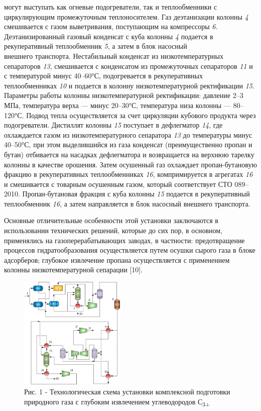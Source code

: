 \begin{multicols}{2}
могут выступать как огневые подогреватели, так и теплообменники с
циркулирующим промежуточным теплоносителем. Газ деэтанизации колонны
\emph{4} смешивается с газом выветривания, поступающим на компрессоры
\emph{6}. Деэтанизированный газовый конденсат с куба колонны \emph{4}
подается в рекуперативный теплообменник \emph{5}, а затем в блок
насосный\\
внешнего транспорта. Нестабильный конденсат из низкотемпературных
сепараторов \emph{13}, смешивается с конденсатом из промежуточных
сепараторов \emph{11} и с температурой минус 40--60°С, подогревается в
рекуперативных теплообменниках \emph{10} и подается в колонну
низкотемпературной ректификации \emph{15}. Параметры работы колонны
низкотемпературной ректификации: давление 2--3 МПа, температура верха
--- минус 20--30°С, температура низа колонны --- 80--120°С. Подвод тепла
осуществляется за счет циркуляции кубового продукта через подогреватели.
Дистиллят колонны \emph{15} поступает в дефлегматор \emph{14}, где
охлаждается газом из низкотемпературного сепаратора \emph{13} до
температуры минус 40--50°С, при этом выделившийся из газа конденсат
(преимущественно пропан и бутан) отбивается на насадках дефлегматора и
возвращается на верхнюю тарелку колонны в качестве орошения. Затем
осушенный газ охлаждает пропан-бутановую фракцию в рекуперативных
теплообменниках \emph{16}, компримируется в агрегатах \emph{16} и
смешивается с товарным осушенным газом, который соответствует СТО
089--2010. Пропан-бутановая фракция с куба колонны \emph{15} подается в
рекуперативный теплообменник \emph{16}, а затем направляется в блок
насосный внешнего транспорта.

Основные отличительные особенности этой установки заключаются в
использовании технических решений, которые до сих пор, в основном,
применялись на газоперерабатывающих заводах, в частности: предотвращение
процессов гидратообразования осуществляется путем осушки сырого газа в
блоке адсорберов; глубокое извлечение пропана осуществляется с
применением колонны низкотемпературной сепарации {[}10{]}.

\begin{figure}[H]
	\centering
	\includegraphics[width=0.45\textwidth]{assets/305}
	\caption*{Рис. 1 - Технологическая схема установки комплексной подготовки
природного газа с глубоким извлечением углеводородов
С\textsubscript{3+}}
\end{figure}


\end{multicols}
